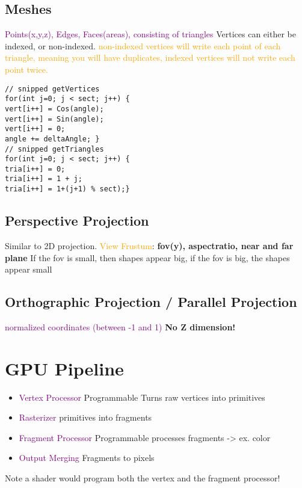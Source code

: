 \documentclass[main.tex,fontsize=12pt,paper=a4,paper=landscape,DIV=calc,]{scrartcl}
\begin{document}
\begin{multicols*}{4}
\subsection{Meshes}
\textcolor{purple}{Points(x,y,z), Edges, Faces(areas), consisting of triangles}
Vertices can either be indexed, or non-indexed.\newline
\textcolor{orange}{non-indexed vertices will write each point of each triangle, meaning you will have duplicates, indexed vertices will not write each point twice.}\newline
\begin{lstlisting}
// snipped getVertices
for(int j=0; j < sect; j++) {
vert[i++] = Cos(angle);
vert[i++] = Sin(angle);
vert[i++] = 0;
angle += deltaAngle; }
// snipped getTriangles
for(int j=0; j < sect; j++) {
tria[i++] = 0;
tria[i++] = 1 + j;
tria[i++] = 1+(j+1) % sect);}
\end{lstlisting}

\subsection{Perspective Projection}
Similar to 2D projection. \newline
\textcolor{orange}{View Frustum}: \newline
\textbf{fov(y), aspectratio, near and far plane}\newline
\textcolor{OliveGreen}{If the fov is small, then shapes appear big, if the fov is big, the shapes appear small}

\subsection{Orthographic Projection / Parallel Projection}
\textcolor{purple}{normalized coordinates (between -1 and 1)}\newline
\textbf{No Z dimension!}

\section{GPU Pipeline}
\begin{itemize}
\item \textcolor{purple}{Vertex Processor} Programmable\newline
  Turns raw vertices into primitives
\item \textcolor{purple}{Rasterizer} primitives into fragments
\item \textcolor{purple}{Fragment Processor} Programmable \newline
  processes fragments -> ex. color
\item \textcolor{purple}{Output Merging} Fragments to pixels
\end{itemize}
Note a shader would program both the vertex and the fragment processor!


\end{multicols*}
\end{document}

